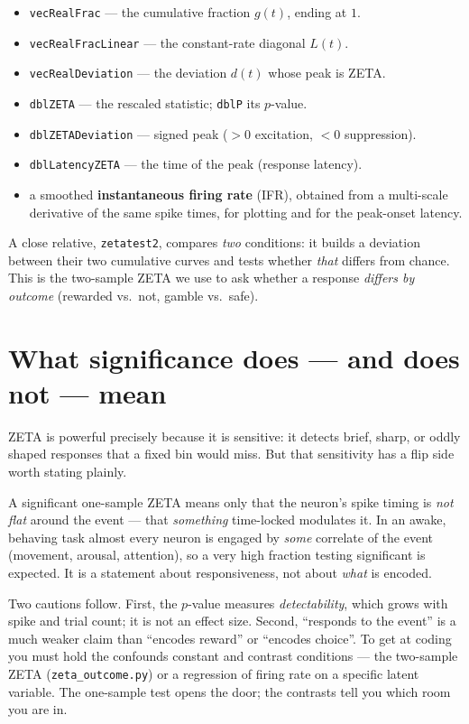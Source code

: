 \documentclass[11pt]{article}
\begin{document}
\begin{itemize}
  \item \texttt{vecRealFrac} --- the cumulative fraction $g(t)$, ending at $1$.
  \item \texttt{vecRealFracLinear} --- the constant-rate diagonal $L(t)$.
  \item \texttt{vecRealDeviation} --- the deviation $d(t)$ whose peak is ZETA.
  \item \texttt{dblZETA} --- the rescaled statistic; \texttt{dblP} its $p$-value.
  \item \texttt{dblZETADeviation} --- signed peak ($>0$ excitation, $<0$
        suppression).
  \item \texttt{dblLatencyZETA} --- the time of the peak (response latency).
  \item a smoothed \textbf{instantaneous firing rate} (IFR), obtained from a
        multi-scale derivative of the same spike times, for plotting and for the
        peak-onset latency.
\end{itemize}

A close relative, \texttt{zetatest2}, compares \emph{two} conditions: it builds
a deviation between their two cumulative curves and tests whether \emph{that}
differs from chance. This is the two-sample ZETA we use to ask whether a
response \emph{differs by outcome} (rewarded vs.\ not, gamble vs.\ safe).

\section{What significance does --- and does not --- mean}

ZETA is powerful precisely because it is sensitive: it detects brief, sharp, or
oddly shaped responses that a fixed bin would miss. But that sensitivity has a
flip side worth stating plainly.

\begin{keybox}
A significant one-sample ZETA means only that the neuron's spike timing is
\emph{not flat} around the event --- that \emph{something} time-locked modulates
it. In an awake, behaving task almost every neuron is engaged by \emph{some}
correlate of the event (movement, arousal, attention), so a very high fraction
testing significant is expected. It is a statement about responsiveness, not
about \emph{what} is encoded.
\end{keybox}

\noindent
Two cautions follow. First, the $p$-value measures \emph{detectability}, which
grows with spike and trial count; it is not an effect size. Second, ``responds
to the event'' is a much weaker claim than ``encodes reward'' or ``encodes
choice''. To get at coding you must hold the confounds constant and contrast
conditions --- the two-sample ZETA (\texttt{zeta\_outcome.py}) or a
regression of firing rate on a specific latent variable. The one-sample test
opens the door; the contrasts tell you which room you are in.
\end{document}
